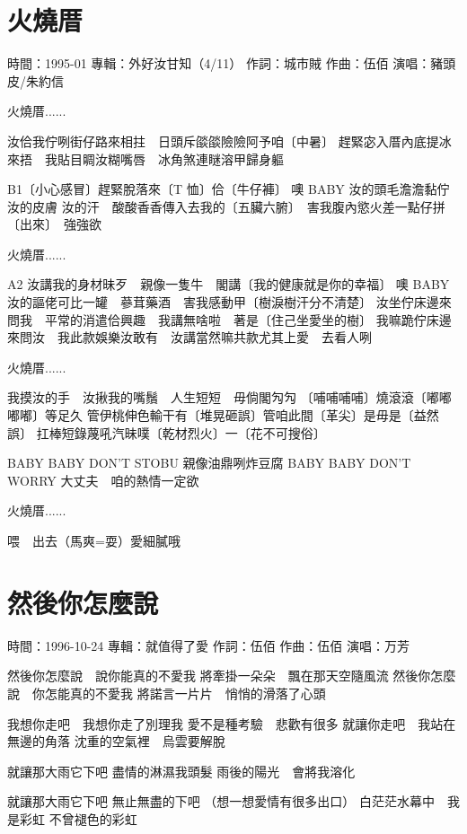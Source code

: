 \documentclass[UTF8,a4paper,oneside,twocolumn,12pt]{ctexbook}
\newcommand{\infopair}[2]{\textbullet #1：#2}
\newcommand{\zc}[1][伍佰]{\infopair{作詞}{#1}}
\newcommand{\zq}[1][伍佰]{\infopair{作曲}{#1}}
\newcommand{\zj}[1]{\infopair{專輯}{#1}}
\newcommand{\sj}[1]{\infopair{時間}{#1}}
\newenvironment{info}{\begin{flushleft}\kaishu
	}
	{\end{flushleft}\normalsize\yahei\par}
\newenvironment{lyric}{
	}
{}
\begin{document}
\section{火燒厝}
\begin{info}
	\sj{1995-01}
	\zj{外好汝甘知（4/11）}
	\zc[城市賊]
	\zq[伍佰]
	\infopair{演唱}{豬頭皮/朱約信}
\end{info}
\begin{lyric}
	火燒厝......

	汝佮我佇咧街仔路來相拄　日頭斥燄燄險險阿予咱〔中暑〕
	趕緊宓入厝內底提冰來捂　我貼目睭汝糊嘴唇　冰角煞連瞇溶甲歸身軀

	B1〔小心感冒〕趕緊脫落來〔T 恤〕佮〔牛仔褲〕
	噢 BABY 汝的頭毛澹澹黏佇汝的皮膚
	汝的汗　酸酸香香傳入去我的〔五臟六腑〕　害我腹內慾火差一點仔拼〔出來〕　強強欲

	火燒厝......

	A2 汝講我的身材昧歹　親像一隻牛　閣講〔我的健康就是你的幸福〕
	噢 BABY 汝的謳佬可比一罐　蔘茸藥酒　害我感動甲〔樹淚樹汗分不清楚〕
	汝坐佇床邊來問我　平常的消遣佮興趣　我講無啥啦　著是〔住己坐愛坐的樹〕
	我嘛跪佇床邊來問汝　我此款娛樂汝敢有　汝講當然嘛共款尤其上愛　去看人咧

	火燒厝......

	我摸汝的手　汝揪我的嘴鬚　人生短短　毋倘閣勼勼
	〔哺哺哺哺〕燒滾滾〔嘟嘟嘟嘟〕等足久
	管伊桃伸色輸干有〔堆晃砸誤〕管咱此間〔革尖〕是毋是〔益然誤〕
	扛棒短錄蔑吼汽昧噗〔乾材烈火〕一〔花不可搜俗〕

	BABY BABY DON'T STOBU 親像油鼎咧炸豆腐
	BABY BABY DON'T WORRY 大丈夫　咱的熱情一定欲

	火燒厝......

	喂　出去（馬爽=耍）愛細膩哦
\end{lyric}

\section{然後你怎麼說}
\begin{info}
	\sj{1996-10-24}
	\zj{就值得了愛}
	\zc
	\zq
	\infopair{演唱}{万芳}
\end{info}
\begin{lyric}
	然後你怎麼說　說你能真的不愛我
	將牽掛一朵朵　飄在那天空隨風流
	然後你怎麼說　你怎能真的不愛我
	將諾言一片片　悄悄的滑落了心頭

	我想你走吧　我想你走了別理我
	愛不是種考驗　悲歡有很多
	就讓你走吧　我站在無邊的角落
	沈重的空氣裡　烏雲要解脫

	就讓那大雨它下吧
	盡情的淋濕我頭髮
	雨後的陽光　會將我溶化

	就讓那大雨它下吧
	無止無盡的下吧
	（想一想愛情有很多出口）
	白茫茫水幕中　我是彩虹
	不曾褪色的彩虹
\end{lyric}
\end{document}

